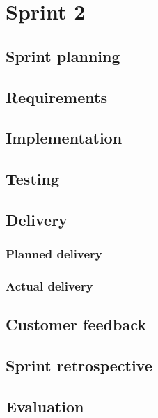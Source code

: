 \section{Sprint 2}

\subsection{Sprint planning}
\subsection{Requirements}
\subsection{Implementation}
\subsection{Testing}
\subsection{Delivery}
\subsubsection{Planned delivery}
\subsubsection{Actual delivery}
\subsection{Customer feedback}
\subsection{Sprint retrospective}
\subsection{Evaluation}